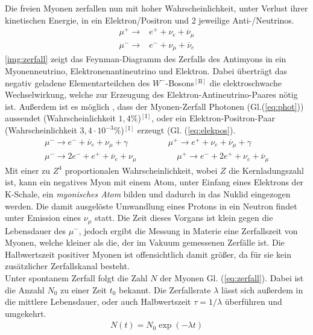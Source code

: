\documentclass[numbers=noenddot,12pt,a4paper]{scrartcl}
\newcommand{\nummat}[1]{\left[\text{#1}\right]}
\newcommand{\ix}[1]{_\text{#1}}
\newcommand{\tilt}[1]{\textit{#1}}
\begin{document}
Die freien Myonen zerfallen nun mit hoher Wahrscheinlichkeit, unter Verlust ihrer kinetischen Energie, in ein Elektron/Positron und 2 jeweilige Anti-/Neutrinos.
\begin{align}
\mu^+\rightarrow& e^++\nu_e+\overline{\nu}_\mu \label{eq:eins}\\
\mu^-\rightarrow& e^-+\nu_\mu+\overline{\nu}_e\label{eq:zwei}
\end{align}
\ref{img:zerfall} zeigt das Feynman-Diagramm des Zerfalls des Antimyons in ein Myonenneutrino, Elektronenantineutrino und Elektron. Dabei überträgt das negativ geladene Elementarteilchen des $W^-$-Bosons$^{\nummat{II}}$ die elektroschwache Wechselwirkung, welche zur Erzeugung des Elektron-Antineutrino-Paares nötig ist.
\newpage
Außerdem ist es möglich , dass der Myonen-Zerfall Photonen (Gl.(\ref{eq:phot})) aussendet (Wahrscheinlichkeit $1,4\%$)$^{\nummat{I}}$, oder ein Elektron-Positron-Paar (Wahrscheinlichkeit $3,4\cdot10^{-3}\%$)$^{\nummat{I}}$ erzeugt (Gl. (\ref{eq:elekpos}).
\begin{align}
	\mu^-\rightarrow e^-+\overline{\nu}_e+\nu_\mu+\gamma \hspace{2cm} \mu^+\rightarrow e^++\nu_e+\overline{\nu}_\mu+\gamma \label{eq:phot}\\
	\mu^-\rightarrow 2e^-+e^++\overline{\nu}_e+\nu_\mu \hspace{2cm} \mu^+\rightarrow e^-+2e^++\nu_e+\overline{\nu}_\mu \label{eq:elekpos}
\end{align}
Mit einer zu $Z^4$ proportionalen Wahrscheinlichkeit, wobei $Z$ die Kernladungszahl ist, kann ein negatives Myon mit einem Atom, unter Einfang eines Elektrons der K-Schale, ein \tilt{myonisches Atom} bilden und dadurch in das Nuklid eingezogen werden. Die damit ausgelöste Umwandlung eines Protons in ein Neutron findet unter Emission eines $\nu_\mu$ statt. Die Zeit dieses Vorgans ist klein gegen die Lebensdauer des $\mu^-$, jedoch ergibt die Messung in Materie eine Zerfallszeit von Myonen, welche kleiner als die, der im Vakuum gemessenen Zerfälle ist. Die Halbwertszeit positiver Myonen ist offensichtlich damit größer, da für sie kein zusätzlicher Zerfallskanal besteht.\\
Unter spontanem Zerfall folgt die Zahl $N$ der Myonen Gl. (\ref{eq:zerfall}). Dabei ist die Anzahl $N\ix{0}$ zu einer Zeit $t\ix{0}$ bekannt. Die Zerfallsrate $\lambda$ lässt sich außerdem in die mittlere Lebensdauer, oder auch Halbwertszeit $\tau=1/\lambda$ überführen und umgekehrt.
\begin{align}
	N(t)=N\ix{0}\exp\left(-\lambda t\right) \label{eq:zerfall}
\end{align}
\end{document}
